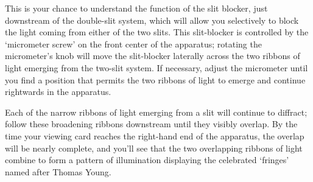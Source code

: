 \documentclass[11pt]{article}
\begin{document}
This is your chance to understand the function of the slit blocker, just
downstream of the double-slit system, which will allow you selectively to block
the light coming from either of the two slits. This slit-blocker is controlled
by the ‘micrometer screw’ on the front center of the apparatus; rotating the
micrometer’s knob will move the slit-blocker laterally across the two ribbons of
light emerging from the two-slit system. %
If necessary, adjust the micrometer until you find a position that permits the 
two ribbons of light to emerge and continue rightwards in the apparatus.

Each of the narrow ribbons of light emerging from a slit will continue to
diffract; follow these broadening ribbons downstream until they visibly overlap.
By the time your viewing card reaches the right-hand end of the apparatus, the
overlap will be nearly complete, and you’ll see that the two overlapping ribbons
of light combine to form a pattern of illumination displaying the celebrated
‘fringes’ named after Thomas Young.



\end{document}
